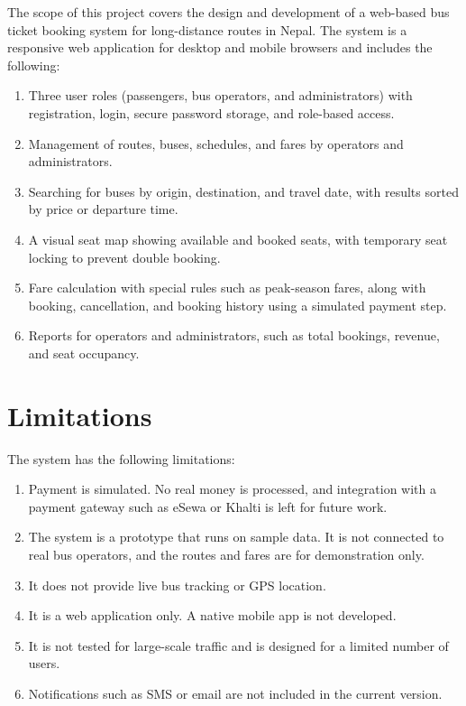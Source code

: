 \documentclass[12pt,a4paper,openany,oneside]{report}
\begin{document}
	The scope of this project covers the design and development of a web-based bus ticket booking system for long-distance routes in Nepal. The system is a responsive web application for desktop and mobile browsers and includes the following:
	\begin{enumerate}
		\item Three user roles (passengers, bus operators, and administrators) with registration, login, secure password storage, and role-based access.
		\item Management of routes, buses, schedules, and fares by operators and administrators.
		\item Searching for buses by origin, destination, and travel date, with results sorted by price or departure time.
		\item A visual seat map showing available and booked seats, with temporary seat locking to prevent double booking.
		\item Fare calculation with special rules such as peak-season fares, along with booking, cancellation, and booking history using a simulated payment step.
		\item Reports for operators and administrators, such as total bookings, revenue, and seat occupancy.
	\end{enumerate}
	
	\section{Limitations}
	
	The system has the following limitations:
	\begin{enumerate}
		\item Payment is simulated. No real money is processed, and integration with a payment gateway such as eSewa or Khalti is left for future work.
		\item The system is a prototype that runs on sample data. It is not connected to real bus operators, and the routes and fares are for demonstration only.
		\item It does not provide live bus tracking or GPS location.
		\item It is a web application only. A native mobile app is not developed.
		\item It is not tested for large-scale traffic and is designed for a limited number of users.
		\item Notifications such as SMS or email are not included in the current version.
	\end{enumerate}
	
\end{document}
